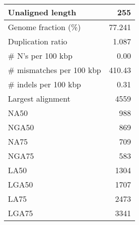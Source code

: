 \documentclass[12pt,a4paper]{article}
\begin{document}
\begin{table}[ht]
\begin{center}
\begin{tabular}{|l*{1}{|r}|}
Unaligned length & 255 \\ \hline
Genome fraction (\%) & 77.241 \\ \hline
Duplication ratio & 1.087 \\ \hline
\# N's per 100 kbp & 0.00 \\ \hline
\# mismatches per 100 kbp & 410.43 \\ \hline
\# indels per 100 kbp & 0.31 \\ \hline
Largest alignment & 4559 \\ \hline
NA50 & 988 \\ \hline
NGA50 & 869 \\ \hline
NA75 & 709 \\ \hline
NGA75 & 583 \\ \hline
LA50 & 1304 \\ \hline
LGA50 & 1707 \\ \hline
LA75 & 2473 \\ \hline
LGA75 & 3341 \\ \hline
\end{tabular}
\end{center}
\end{table}
\end{document}
